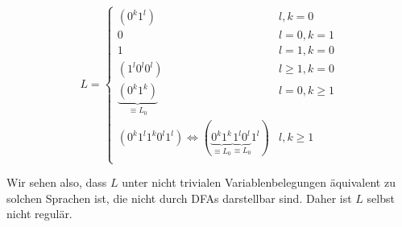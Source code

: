 \begin{enumerate}[a)]
\[ L=
\begin{cases}
(0^k 1^l) & l,k = 0 \\
            0 & l = 0, k=1 \\
            1 & l = 1, k=0 \\
(1^l 0^l 0^l) & l \geq 1, k=0 \\
    \underbrace{(0^k 1^k)}_{\equiv L_0} & l=0, k \geq 1 \\
(0^k 1^l 1^k 0^l 1^l) \iff (\underbrace{0^k 1^k}_{\equiv L_0} \underbrace{1^l 0^l}_{\equiv L_0} 1^l) & l,k \geq 1 \\
\end{cases}
\]

Wir sehen also, dass $L$ unter nicht trivialen Variablenbelegungen äquivalent zu solchen Sprachen ist, die nicht durch DFAs darstellbar sind. Daher ist $L$ selbst nicht regulär.


\end{enumerate}





















